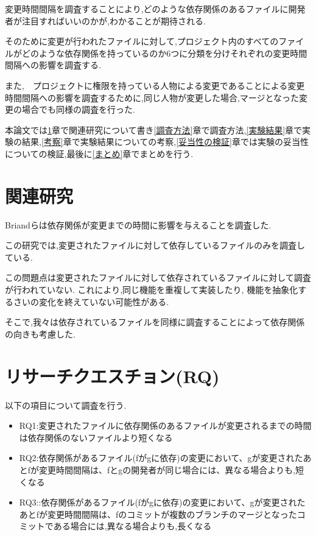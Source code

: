 \documentclass{fose2016}           %
\begin{document}
変更時間間隔を調査することにより,どのような依存関係のあるファイルに開発者が注目すればいいのかが,わかることが期待される.

そのために変更が行われたファイルに対して,プロジェクト内のすべてのファイルがどのような依存関係を持っているのか6つに分類を分けそれぞれの変更時間間隔への影響を調査する.

また,　プロジェクトに権限を持っている人物による変更であることによる変更時間間隔への影響を調査するために,同じ人物が変更した場合,マージとなった変更の場合でも同様の調査を行った.


本論文では\ref{関連研究}章で関連研究について書き\ref{調査方法}章で調査方法,\ref{実験結果}章で実験の結果,\ref{考察}章で実験結果についての考察,\ref{妥当性の検証}章では実験の妥当性についての検証,最後に\ref{まとめ}章でまとめを行う.


\section{関連研究}\label{関連研究}

Briand\cite{Briand}らは依存関係が変更までの時間に影響を与えることを調査した.

この研究では,変更されたファイルに対して依存しているファイルのみを調査している.

この問題点は変更されたファイルに対して依存されているファイルに対して調査が行われていない.
これにより,同じ機能を重複して実装したり, 機能を抽象化するさいの変化を終えていない可能性がある.

そこで,我々は依存されているファイルを同様に調査することによって依存関係の向きも考慮した.


\section{リサーチクエスチョン(RQ)}\label{リサーチクエスチョン}
以下の項目について調査を行う.
\begin{itemize}
\item RQ1:変更されたファイルに依存関係のあるファイルが変更されるまでの時間は依存関係のないファイルより短くなる
\item RQ2:依存関係があるファイル(fがgに依存)の変更において、gが変更されたあとfが変更時間間隔は、fとgの開発者が同じ場合には、異なる場合よりも,短くなる
\item RQ3::依存関係があるファイル(fがgに依存)の変更において、gが変更されたあとfが変更時間間隔は、fのコミットが複数のブランチのマージとなったコミットである場合には,異なる場合よりも,長くなる
\end{itemize}
\end{document}
